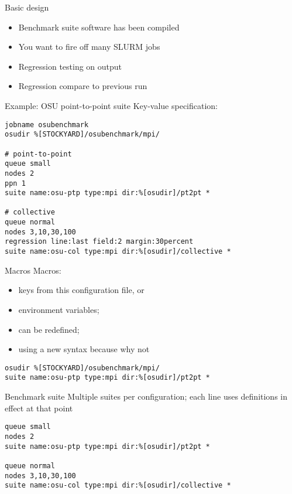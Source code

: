 \begin{numberedframe}{Basic design}
  \begin{itemize}
  \item Benchmark suite software has been compiled
  \item You want to fire off many SLURM jobs
  \item Regression testing on output
  \item Regression compare to previous run
  \end{itemize}
\end{numberedframe}

\begin{numberedframe}{Example: OSU point-to-point suite}
  Key-value specification:
\begin{verbatim}
jobname osubenchmark
osudir %[STOCKYARD]/osubenchmark/mpi/

# point-to-point
queue small
nodes 2
ppn 1
suite name:osu-ptp type:mpi dir:%[osudir]/pt2pt *

# collective
queue normal
nodes 3,10,30,100
regression line:last field:2 margin:30percent
suite name:osu-col type:mpi dir:%[osudir]/collective *
\end{verbatim}
\end{numberedframe}

\begin{numberedframe}{Macros}
  Macros:
  \begin{itemize}
  \item keys from this configuration file, or
  \item environment variables;
  \item can be redefined;
  \item using a new syntax because why not
  \end{itemize}
\begin{verbatim}
osudir %[STOCKYARD]/osubenchmark/mpi/
suite name:osu-ptp type:mpi dir:%[osudir]/pt2pt *
\end{verbatim}
\end{numberedframe}

\begin{numberedframe}{Benchmark suite}
  Multiple suites per configuration;
  each  line uses definitions in effect at that point
\begin{verbatim}
queue small
nodes 2
suite name:osu-ptp type:mpi dir:%[osudir]/pt2pt *

queue normal
nodes 3,10,30,100
suite name:osu-col type:mpi dir:%[osudir]/collective *
\end{verbatim}
\end{numberedframe}

